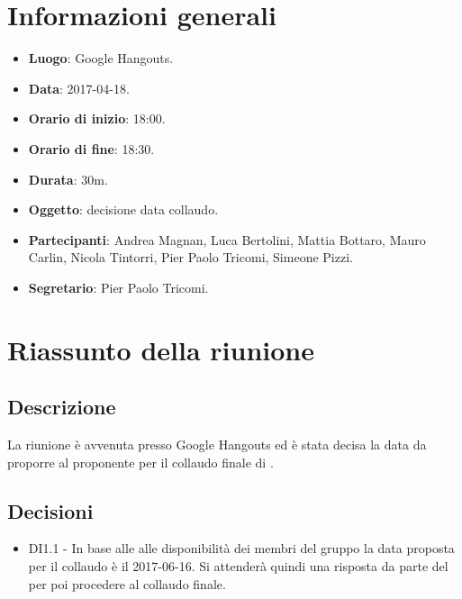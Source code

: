 \documentclass[a4paper,titlepage]{article}
\begin{document}
\maketitle
\begin{diario}
\end{diario}
\newpage
\tableofcontents

\newpage
\section{Informazioni generali}
\label{sec:Informazioni}

\begin{itemize}
  \item \textbf{Luogo}: Google Hangouts.
  \item \textbf{Data}: 2017-04-18.
  \item \textbf{Orario di inizio}: 18:00.
  \item \textbf{Orario di fine}: 18:30.
  \item \textbf{Durata}: 30m.
  \item \textbf{Oggetto}: decisione data collaudo.
  \item \textbf{Partecipanti}: Andrea Magnan, Luca Bertolini, Mattia Bottaro, Mauro Carlin, Nicola Tintorri, Pier Paolo Tricomi, Simeone Pizzi.
  \item \textbf{Segretario}: Pier Paolo Tricomi.

\end{itemize}
\section{Riassunto della riunione}
\label{sec:RiassuntoRiunione}
 \subsection{Descrizione}
La riunione è avvenuta presso Google Hangouts ed è stata decisa la data da proporre al proponente \PROPONENTE{} per il collaudo finale di \PROGETTO{}. 
 \subsection{Decisioni}
 \begin{itemize}
  \item DI1.1 - In base alle alle disponibilità dei membri del gruppo \GRUPPO{} la data proposta per il collaudo è il 2017-06-16. Si attenderà quindi una risposta da parte del \PROPONENTE{} per poi procedere al collaudo finale.
 \end{itemize}
\end{document}
